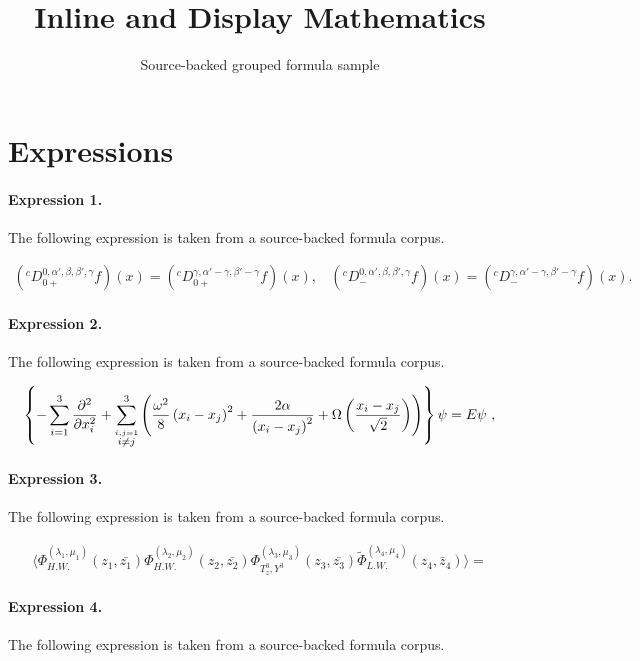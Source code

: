 \documentclass[11pt]{article}
\title{Inline and Display Mathematics}
\author{Source-backed grouped formula sample}
\date{}
\begin{document}
\maketitle
\section{Expressions}
\paragraph{Expression 1.} The following expression is taken from a source-backed formula corpus.

\begin{align*}\left({}^{c}D_{0+}^{0,\alpha',\beta,\beta',\gamma}f\right)(x)=\left({}^{c}D_{0+}^{\gamma,\alpha'-\gamma,\beta'-\gamma}f\right)(x),\ \ \ \ \left({}^{c}D_{-}^{0,\alpha',\beta,\beta',\gamma}f\right)(x)=\left({}^{c}D_{-}^{\gamma,\alpha'-\gamma,\beta'-\gamma}f\right)(x).\end{align*}

\paragraph{Expression 2.} The following expression is taken from a source-backed formula corpus.

\begin{align*}\left\{ -\sum_{i=1}^3 \frac{\partial^2}{\partial x_i^2} + \sum_{\stackrel{i,j=1}{i\neq j}}^3 \left({{\omega^2}\over {8}} \left( x_i-x_j \right)^2 + {2 \alpha\over {\left( x_i-x_j \right)^{2} }}+\Omega\left(\frac{x_i-x_j}{\sqrt{2}}\right) \right)\right\}\psi=E\psi~,\end{align*}

\paragraph{Expression 3.} The following expression is taken from a source-backed formula corpus.

\begin{align*}\langle \Phi_{H.W.}^{(\lambda_{1} , \mu_{1})}(z_{1} ,\bar{z_{1}})\Phi_{H.W.}^{(\lambda_{2} , \mu_{2})}(z_{2} ,\bar{z_{2}})\Phi_{T_{z}^{3} , Y^{3}}^{(\lambda_{3} , \mu_{3})}(z_{3} ,\bar{z_{3}})\tilde\Phi_{L.W.}^{(\lambda_{4} , \mu_{4})}(z_{4} , \bar{z}_{4})\rangle =\end{align*}

\paragraph{Expression 4.} The following expression is taken from a source-backed formula corpus.
\end{document}
